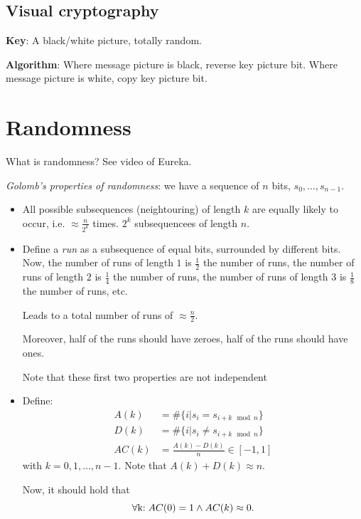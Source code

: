 \documentclass[language=english,number=]{homework}
\begin{document}
    \subsection{Visual cryptography}

    \textbf{Key}: A black/white picture, totally random.

    \textbf{Algorithm}: Where message picture is black, reverse key picture bit.
    Where message picture is white, copy key picture bit.

    \newpage
    \section{Randomness}

    What is randomness?
    See video of Eureka.

    \textit{Golomb's properties of randomness}: we have a sequence of $n$ bits, $s_0, \dots, s_{n-1}$.
    \begin{itemize}
        \item All possible subsequences (neightouring) of length $k$ are equally likely to occur, i.e. $\approx \frac{n}{2^k}$ times.
        $2^k$ subsequencees of length $n$.
        \item Define a \textit{run} as a subsequence of equal bits, surrounded by different bits.
        Now, the number of runs of length $1$ is $\frac{1}{2}$ the number of runs, the number of runs of length $2$ is $\frac{1}{4}$ the number of runs, the number of runs of length $3$ is $\frac{1}{8}$ the number of runs, etc.

        Leads to a total number of runs of $\approx \frac{n}{2}$.

        Moreover, half of the runs should have zeroes, half of the runs should have ones.

        Note that these first two properties are not independent
        \item Define:
        \begin{align*}
            A(k) &= \# \{i | s_i = s_{i + k \mod n} \} \\
            D(k) &= \# \{i | s_i \ne s_{i + k \mod n} \} \\
            AC(k) &= \frac{A(k) - D(k)}{n} \in [-1,1]
        \end{align*}
        with $k = 0, 1, \dots, n-1$.
        Note that $A(k) + D(k) \approx n$.

        Now, it should hold that
        \[
            \forall $k$ : AC(0) = 1 \wedge AC(k) \approx 0.
        \]
    \end{itemize}
\end{document}
